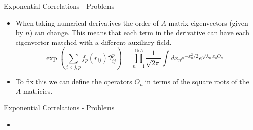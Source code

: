 \documentclass{beamer}
\newcommand{\red}[1]{{\color{red}{#1}}}
\newcommand{\Opij}{\mathcal{O}_{ij}^p}
\begin{document}
\begin{frame}{Exponential Correlations - Problems}
\red{EXPLAIN WHY WE NEED SQRT MARTIX}
\begin{itemize}
   \item When taking numerical derivatives the order of $A$ matrix eigenvectors (given by $n$) can change. This means that each term in the derivative can have each eigenvector matched with a different auxiliary field.
   \begin{equation*}
      \exp\left(\sum\limits_{i<j,p}f_p(r_{ij})\Opij\right) = \prod\limits_{n=1}^{15A} \frac{1}{\sqrt{2\pi}}\int dx_n e^{-x_n^2/2}e^{\sqrt{\lambda_n}x_nO_n}
   \end{equation*}
   \item To fix this we can define the operators $O_n$ in terms of the square roots of the $A$ matricies.
\end{itemize}
\end{frame}

\begin{frame}{Exponential Correlations - Problems}
\begin{itemize}
   \item \red{FINISH THIS!}
\end{itemize}
\end{frame}

\end{document}
